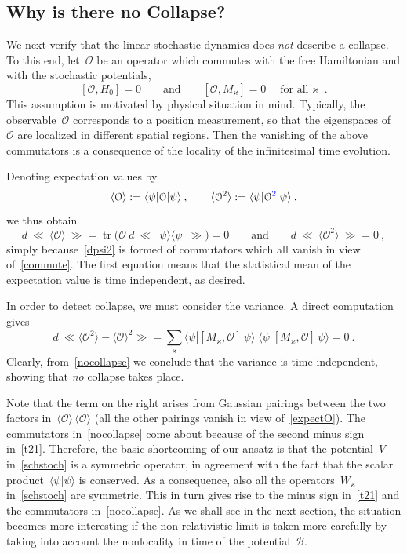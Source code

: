 \documentclass[reqno,11pt]{amsart}
\numberwithin{equation}{section}
\newcommand{\bl}{\textcolor{blue}}%
\newcommand{\beq}{\begin{equation}}
\newcommand{\eeq}{\end{equation}}
\newcommand{\la}{\langle}
\newcommand{\ra}{\rangle}
\newcommand{\bbra}{\mathopen{\ll}}
\newcommand{\kket}{\mathclose{\gg}}
\newcommand{\1}{\mathds{1}}
\DeclareMathOperator{\tr}{tr}
\newcommand{\B}{{\mathscr{B}}}
\begin{document}
\subsection{Why is there no Collapse?} \label{secnocollapse}
We next verify that the linear stochastic dynamics does {\em{not}} describe a collapse. To this end,
let~${\mathcal{O}}$ be an operator which commutes with the free Hamiltonian and with the stochastic potentials,
\beq \label{commute}
[{\mathcal{O}}, H_0] =0 \qquad \text{and} \qquad [{\mathcal{O}}, M_\varkappa] = 0 \quad \text{for all~$\varkappa$}\:.
\eeq
This assumption is motivated by physical situation in mind. Typically, the observable~${\mathcal{O}}$
corresponds to a position measurement, so that the eigenspaces of~${\mathcal{O}}$ are localized
in different spatial regions. Then the vanishing of the above commutators is a consequence of the
locality of the infinitesimal time evolution.

Denoting expectation values by
\[ \la {\mathcal{O}} \ra := \la \psi | {\mathcal{O}} | \psi \ra \:,\qquad \la {\mathcal{O}}^2 \ra := \la \psi | {\mathcal{O}\bl{^2}} | \psi \ra \:, \]
we thus obtain
\beq \label{expectO}
d\: \bbra\:  \la {\mathcal{O}} \ra\: \kket = \tr \Big( {\mathcal{O}}\:  d \:\bbra\: |\psi \ra \la \psi | \:\kket \Big) = 0 \qquad \text{and} \qquad
d \:\bbra\: \la {\mathcal{O}}^2 \ra\: \kket = 0 \:,
\eeq
simply because~\eqref{dpsi2} is formed of commutators which all vanish in view of~\eqref{commute}.
The first equation means that the statistical mean of the expectation value is time independent, as desired.

In order to detect collapse, we must consider the variance. A direct computation gives
\beq \label{nocollapse}
d \:\bbra \la {\mathcal{O}}^2 \ra - \la {\mathcal{O}} \ra^2 \kket =
\sum_\varkappa \la \psi | [M_\varkappa, {\mathcal{O}}] \, \psi \ra \; 
\la \psi | [M_\varkappa, {\mathcal{O}}] \, \psi \ra = 0 \:.
\eeq
Clearly, from~\eqref{nocollapse} we conclude that the variance is time independent, showing
that {\em{no}} collapse takes place.

Note that the term on the right arises from Gaussian pairings between the two factors
in~$\la {\mathcal{O}} \ra\,\la {\mathcal{O}} \ra$
(all the other pairings vanish in view of~\eqref{expectO}). The commutators in~\eqref{nocollapse}
come about because
of the second minus sign in~\eqref{t21}. Therefore, the basic shortcoming of our ansatz is that
the potential~$V$ in~\eqref{schstoch} is a symmetric operator, in agreement with the fact that
the scalar product~$\la \psi | \psi \ra$ is conserved. As a consequence, also all the operators~$W_\varkappa$
in~\eqref{schstoch} are symmetric. This in turn gives rise to the minus sign in~\eqref{t21}
and the commutators in~\eqref{nocollapse}.
As we shall see in the next section, the situation becomes more interesting if the non-relativistic
limit is taken more carefully by taking into account the nonlocality in time of the potential~$\B$.
\end{document}
